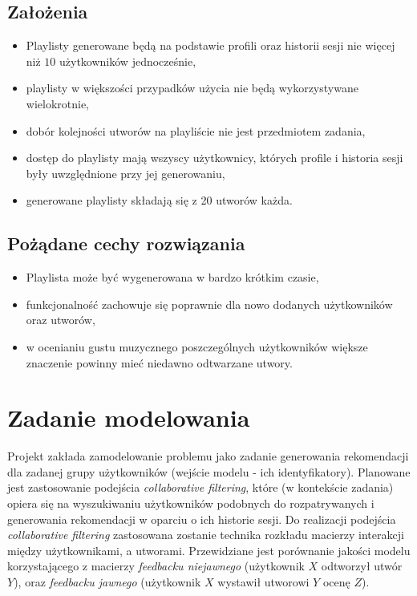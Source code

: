 \documentclass[10pt,a4paper]{article}
\begin{document}
\subsection{Założenia}
\begin{itemize}
	\item Playlisty generowane będą na podstawie profili oraz historii sesji nie więcej niż $10$ użytkowników jednocześnie,
	\item playlisty w większości przypadków użycia nie będą wykorzystywane wielokrotnie,
	\item dobór kolejności utworów na playliście nie jest przedmiotem zadania,
	\item dostęp do playlisty mają wszyscy użytkownicy, których profile i historia sesji były uwzględnione przy jej generowaniu,
	\item generowane playlisty składają się z 20 utworów każda.
\end{itemize}

\subsection{Pożądane cechy rozwiązania}
\begin{itemize}

\item Playlista może być wygenerowana w bardzo krótkim czasie,

\item funkcjonalność zachowuje się poprawnie dla nowo dodanych użytkowników oraz utworów,

\item w ocenianiu gustu muzycznego poszczególnych użytkowników większe znaczenie powinny mieć niedawno odtwarzane utwory.

\end{itemize}

\section{Zadanie modelowania}
	
Projekt zakłada zamodelowanie problemu jako zadanie generowania rekomendacji dla zadanej grupy użytkowników (wejście modelu - ich identyfikatory).  Planowane jest zastosowanie podejścia \textit{collaborative filtering}, które (w kontekście zadania) opiera się na wyszukiwaniu użytkowników podobnych do rozpatrywanych i generowania rekomendacji w oparciu o ich historie sesji. Do realizacji podejścia \textit{collaborative filtering} zastosowana zostanie technika rozkładu macierzy interakcji między użytkownikami, a utworami. Przewidziane jest porównanie jakości modelu korzystającego z macierzy \textit{feedbacku niejawnego} (użytkownik $X$ odtworzył utwór $Y$), oraz \textit{feedbacku jawnego} (użytkownik $X$ wystawił utworowi $Y$ ocenę $Z$).
\end{document}
